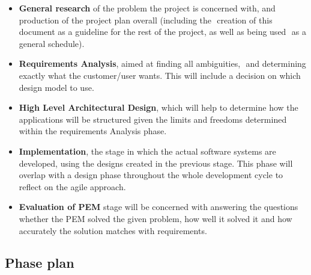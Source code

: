 \documentclass[12pt, a4paper]{report}   %
\begin{document}
\begin{itemize}
\item \textbf{General research} of the problem the project is concerned with, and production of the project plan overall (including the  creation of this document as a guideline for the rest of the project, as well as being used  as a general schedule). 



\item \textbf{Requirements Analysis}, aimed at finding all ambiguities,  and determining exactly what the customer/user wants. This will include a decision on which  design model to use.



\item \textbf{High Level Architectural Design}, which will help to determine how the applications will be structured given the limits and freedoms determined within the requirements Analysis phase.

\item \textbf{Implementation}, the stage in which the actual software systems are developed, using the designs created in the previous stage. This phase will overlap with a design phase throughout the whole development cycle to reflect on the agile approach.

\item \textbf{Evaluation of PEM} stage will be concerned with answering the questions whether the PEM solved the given problem, how well it solved it and how accurately the solution matches with requirements. 
\end{itemize}


\subsection{Phase plan}
\end{document}
